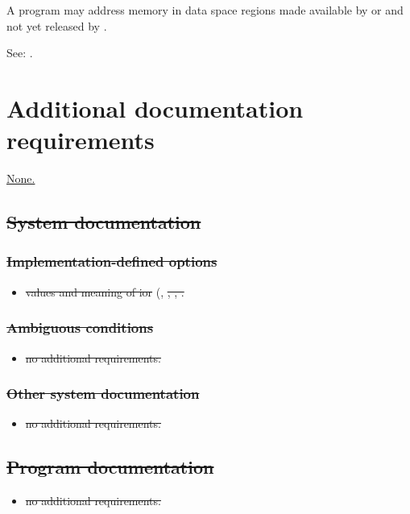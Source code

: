 A program may address memory in data space regions made available
by  or  and not yet released by .

See: .


\section{Additional documentation requirements} %
\label{mem:docs}

\cbstart{}
\uline{None.}

\subsection[System documentation]{\sout{System documentation}} %

\subsubsection[Implementation-defined options]{\sout{Implementation-defined options}} %
\begin{itemize}
\item \sout{values and meaning of ior}
	(,
	 \sout{,
	 ,
	 .}
\end{itemize}

\subsubsection[]{\sout{Ambiguous conditions}} %
\begin{itemize}
\item \sout{no additional requirements.}
\end{itemize}

\subsubsection[]{\sout{Other system documentation}} %
\begin{itemize}
\item \sout{no additional requirements.}
\end{itemize}

\subsection[]{\sout{Program documentation}} %
\begin{itemize}
\item \sout{no additional requirements.}
\end{itemize}
\cbend

